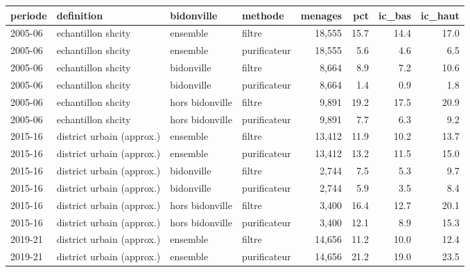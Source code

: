 \begin{tabular}{llllrrrr}
\toprule
periode & definition & bidonville & methode & menages & pct & ic\_bas & ic\_haut
\\
\midrule
2005-06 & echantillon shcity & ensemble & filtre & 18,555 & 15.7 & 14.4 & 17.0 \\
2005-06 & echantillon shcity & ensemble & purificateur & 18,555 & 5.6 & 4.6 & 6.5 \\
2005-06 & echantillon shcity & bidonville & filtre & 8,664 & 8.9 & 7.2 & 10.6 \\
2005-06 & echantillon shcity & bidonville & purificateur & 8,664 & 1.4 & 0.9 & 1.8 \\
2005-06 & echantillon shcity & hors bidonville & filtre & 9,891 & 19.2 & 17.5 & 20.9 \\
2005-06 & echantillon shcity & hors bidonville & purificateur & 9,891 & 7.7 & 6.3 & 9.2 \\
2015-16 & district urbain (approx.) & ensemble & filtre & 13,412 & 11.9 & 10.2 & 13.7 \\
2015-16 & district urbain (approx.) & ensemble & purificateur & 13,412 & 13.2 & 11.5 & 15.0 \\
2015-16 & district urbain (approx.) & bidonville & filtre & 2,744 & 7.5 & 5.3 & 9.7 \\
2015-16 & district urbain (approx.) & bidonville & purificateur & 2,744 & 5.9 & 3.5 & 8.4 \\
2015-16 & district urbain (approx.) & hors bidonville & filtre & 3,400 & 16.4 & 12.7 & 20.1 \\
2015-16 & district urbain (approx.) & hors bidonville & purificateur & 3,400 & 12.1 & 8.9 & 15.3 \\
2019-21 & district urbain (approx.) & ensemble & filtre & 14,656 & 11.2 & 10.0 & 12.4 \\
2019-21 & district urbain (approx.) & ensemble & purificateur & 14,656 & 21.2 & 19.0 & 23.5 \\
\bottomrule
\end{tabular}
